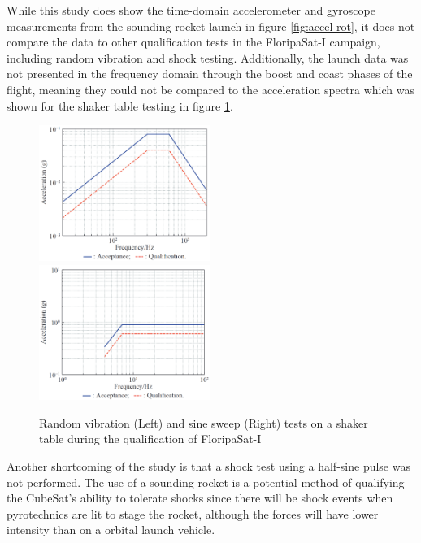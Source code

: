 \documentclass{report}
\begin{document}
While this study does show the time-domain accelerometer and gyroscope measurements from the sounding rocket launch in figure \ref{fig:accel-rot}, it does not compare the data to other qualification tests in the FloripaSat-I campaign, including random vibration and shock testing. Additionally, the launch data was not presented in the frequency domain through the boost and coast phases of the flight, meaning they could not be compared to the acceleration spectra which was shown for the shaker table testing in figure \ref{fig:shaker}.

\begin{figure}[H]
  \includegraphics[width=0.495\textwidth]{images/floripa-random-spectrum.png}
  \includegraphics[width=0.495\textwidth]{images/floripa-sinusoid.png}
  \caption{Random vibration (Left) and sine sweep (Right) tests on a shaker table during the qualification of FloripaSat-I \cite{9316404}}
  \label{fig:shaker}
\end{figure}

Another shortcoming of the study is that a shock test using a half-sine pulse was not performed. The use of a sounding rocket is a potential method of qualifying the CubeSat's ability to tolerate shocks since there will be shock events when pyrotechnics are lit to stage the rocket, although the forces will have lower intensity than on a orbital launch vehicle.
\end{document}
